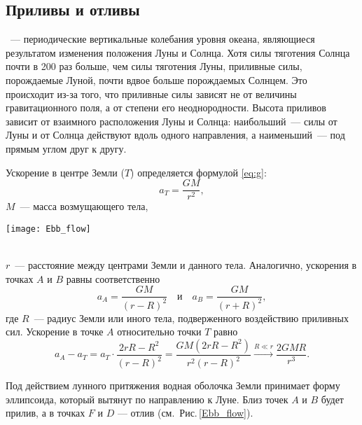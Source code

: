 \subsection{Приливы и отливы}

~--- периодические вертикальные колебания уровня океана, являющиеся результатом изменения положения Луны и Солнца. Хотя силы тяготения Солнца почти в 200 раз больше, чем силы тяготения Луны, приливные силы, порождаемые Луной, почти вдвое больше порождаемых Солнцем. Это происходит из-за того, что приливные силы зависят не от величины гравитационного поля, а от степени его неоднородности. Высота приливов зависит от взаимного расположения Луны и Солнца: наибольший~---  силы от Луны и от Солнца действуют вдоль одного направления, а наименьший~--- под прямым углом друг к другу.

\begin{minipage}{.24\tw}
Ускорение в центре Земли ($T$) определяется формулой \eqref{eq:g}:
\begin{equation*}
	a_T=\frac{G M}{r^2},
\end{equation*}
$M$~--- масса возмущающего тела,
\end{minipage}
\hfill
\begin{minipage}{0.74\tw}
	\vspace{-.5pc}
	\texttt{[image: Ebb\_flow]}
	\label{Ebb_flow}
\end{minipage}\\[-0.5pc]

$r$~--- расстояние между центрами Земли и данного тела. Аналогично, ускорения в точках $A$ и $B$ равны соответственно
\begin{equation}
	a_A = \frac{G M}{(r - R)^2} \quad \text{и} \quad a_B = \frac{GM}{(r + R)^2},
\end{equation}
где $R$~--- радиус Земли или иного тела, подверженного воздействию приливных сил. Ускорение в точке $A$ относительно точки $T$ равно
\begin{equation}
	a_A - a_T = a_T \cdot \frac{2 r R - R^2}{(r - R)^2} = \frac{GM \left(2 r R - R^2 \right)}{r^2 (r - R)^2} \xrightarrow{R \ll r} \frac{2 G M R}{r^3}.
	\label{eq:ebb-force}
\end{equation}

Под действием лунного притяжения водная оболочка Земли принимает форму 
эллипсоида, который вытянут по направлению к Луне. Близ точек $A$ и $B$ будет 
прилив, а в точках $F$ и $D$ --- отлив (см.~Рис.\,\ref{Ebb_flow}).